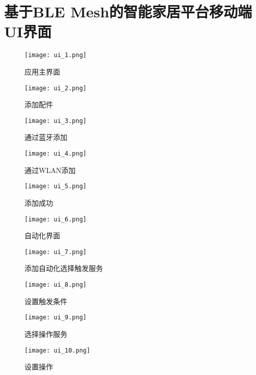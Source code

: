 \chapter{基于BLE Mesh的智能家居平台移动端UI界面}
\begin{figure}[H]
  \begin{minipage}{0.25\textwidth}
    \centering
    \texttt{[image: ui\_1.png]}
    \caption{应用主界面}
    \label{fig:mobile_ui_1}
  \end{minipage}\hfill
  \begin{minipage}{0.25\textwidth}
    \centering
    \texttt{[image: ui\_2.png]}
    \caption{添加配件}
    \label{fig:mobile_ui_2}
  \end{minipage}\hfill
  \begin{minipage}{0.25\textwidth}
    \centering
    \texttt{[image: ui\_3.png]}
    \caption{通过蓝牙添加}
    \label{fig:mobile_ui_3}
  \end{minipage}
\end{figure}
\begin{figure}[H]
  \begin{minipage}{0.25\textwidth}
    \centering
    \texttt{[image: ui\_4.png]}
    \caption{通过WLAN添加}
    \label{fig:mobile_ui_4}
  \end{minipage}\hfill
  \begin{minipage}{0.25\textwidth}
    \centering
    \texttt{[image: ui\_5.png]}
    \caption{添加成功}
    \label{fig:mobile_ui_5}
  \end{minipage}\hfill
  \begin{minipage}{0.25\textwidth}
    \centering
    \texttt{[image: ui\_6.png]}
    \caption{自动化界面}
    \label{fig:mobile_ui_6}
  \end{minipage}
\end{figure}
\begin{figure}[H]
  \begin{minipage}{0.25\textwidth}
    \centering
    \texttt{[image: ui\_7.png]}
    \caption{添加自动化选择触发服务}
    \label{fig:mobile_ui_7}
  \end{minipage}\hfill
  \begin{minipage}{0.25\textwidth}
    \centering
    \texttt{[image: ui\_8.png]}
    \caption{设置触发条件}
    \label{fig:mobile_ui_8}
  \end{minipage}\hfill
  \begin{minipage}{0.25\textwidth}
    \centering
    \texttt{[image: ui\_9.png]}
    \caption{选择操作服务}
    \label{fig:mobile_ui_9}
  \end{minipage}
\end{figure}
\begin{figure}[H]
  \centering
  \texttt{[image: ui\_10.png]}
  \caption{设置操作}
  \label{fig:mobile_ui_10}
\end{figure}

